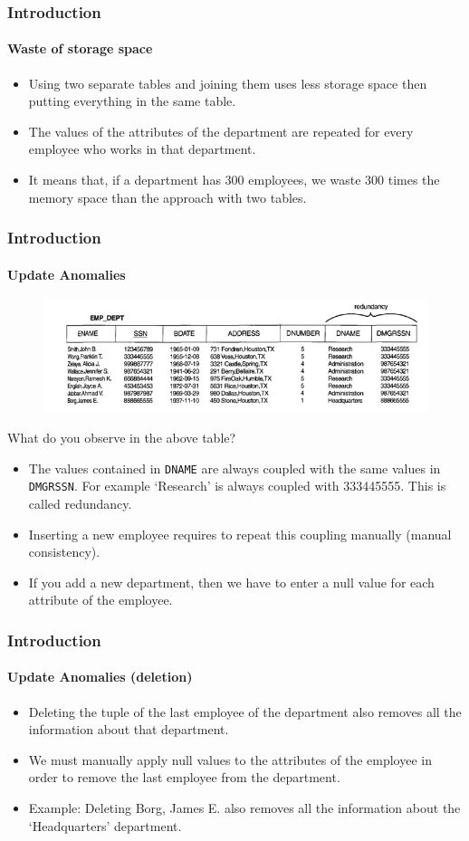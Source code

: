 \documentclass{beamer}
\begin{document}
\begin{frame}
	\frametitle{Introduction}
	\framesubtitle{Waste of storage space}
	\begin{itemize}
		\item Using two separate tables and joining them uses less storage space then putting everything in the same table.
		\pause
		\item The values of the attributes of the department are repeated for every employee who works in that department.
		\item It means that, if a department has 300 employees, we waste 300 times the memory space than the approach with two tables.
	\end{itemize}
\end{frame}

\begin{frame}
	\frametitle{Introduction}
	\framesubtitle{Update Anomalies}
	\begin{figure}
		\includegraphics[scale = 0.45]{img/normalization/norm2}
	\end{figure}
	What do you observe in the above table?
	\pause
	\begin{itemize}
		\item The values contained in \texttt{DNAME} are always coupled with the same values in \texttt{DMGRSSN}. For example ‘Research’ is always coupled with 333445555. This is called redundancy.
		\pause
		\item Inserting a new employee requires to repeat this coupling manually (manual consistency).
		\pause
		\item If you add a new department, then we have to enter a null value for each attribute of the employee.
	\end{itemize}
\end{frame}

\begin{frame}
	\frametitle{Introduction}
	\framesubtitle{Update Anomalies (deletion)}
	
	\begin{itemize}
		\item Deleting the tuple of the last employee of the department also removes all the information about that department.
		\pause
		\item We must manually apply null values to the attributes of the employee in order to remove the last employee from the department.
		\pause
		\item Example: Deleting Borg, James E. also removes all the information about the ‘Headquarters’ department.		
	\end{itemize}
\end{frame}
\end{document}
